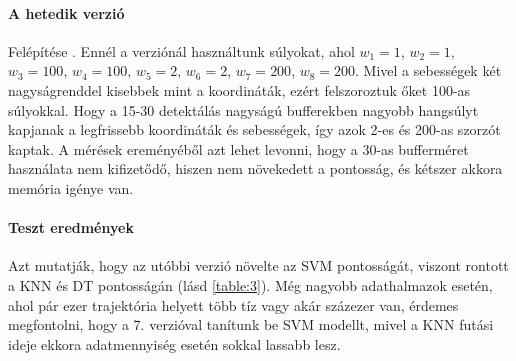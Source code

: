 \documentclass[acmtog, authorversion]{acmart}
\begin{document}
\paragraph{A hetedik verzió} Felépítése \begin{math}[x_0 \cdot w_1, y_0 \cdot w_2, v_{x_0} \cdot w_3, v_{y_0} \cdot w_4, x_l \cdot w_5, y_l \cdot w_6, v_{x_l} \cdot w_7, v_{y_l} \cdot w_8]\end{math}.
Ennél a verziónál használtunk súlyokat, ahol \begin{math}w_1=1\end{math}, \begin{math}w_2=1\end{math}, \begin{math}w_3=100\end{math}, \begin{math}w_4=100\end{math},
\begin{math}w_5=2\end{math}, \begin{math}w_6=2\end{math}, \begin{math}w_7=200\end{math}, \begin{math}w_8=200\end{math}. Mivel a sebességek két 
nagyságrenddel kisebbek mint a koordináták, ezért felszoroztuk őket 100-as súlyokkal. Hogy a 15-30 detektálás nagyságú bufferekben nagyobb hangsúlyt kapjanak a legfrissebb
koordináták és sebességek, így azok 2-es és 200-as szorzót kaptak. A mérések ereményéből azt lehet levonni, hogy a 30-as bufferméret használata nem kifizetődő, hiszen nem növekedett a pontosság, és kétszer akkora memória igénye van.
\paragraph{Teszt eredmények} Azt mutatják, hogy az utóbbi verzió növelte az SVM pontosságát, viszont rontott a KNN és DT pontosságán (lásd \ref{table:3}). Még nagyobb adathalmazok esetén, ahol pár ezer trajektória helyett több tíz vagy akár százezer van, érdemes megfontolni, hogy a 7. verzióval tanítunk be SVM modellt, mivel a KNN futási ideje ekkora adatmennyiség esetén sokkal lassabb lesz.
\end{document}
